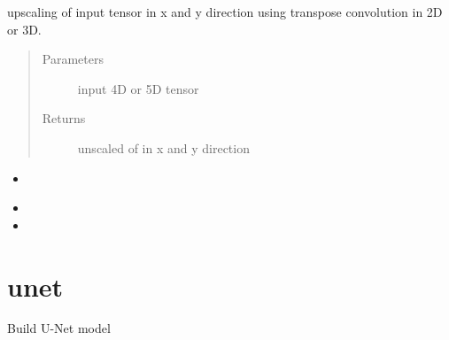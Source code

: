 \documentclass[letterpaper,10pt,english]{sphinxmanual}
\begin{document}
\begin{fulllineitems}
\label{\detokenize{index:unet.ops.up_conv}}
upscaling of input tensor in x and y direction using transpose convolution in 2D or 3D.
\begin{quote}\begin{description}
\item[{Parameters}] \leavevmode
{} \textendash{} input 4D or 5D tensor

\item[{Returns}] \leavevmode
unscaled of  in x and y direction

\end{description}\end{quote}



\begin{itemize}
\item {} 
{\hyperref[\detokenize{index:unet.ops.MaxPoolingND}]{}}

\item {} 

\item {} 

\end{itemize}



\end{fulllineitems}



\section{unet}
\label{\detokenize{index:module-unet.unet}}\label{\detokenize{index:unet}}
Build U-Net model
\end{document}
